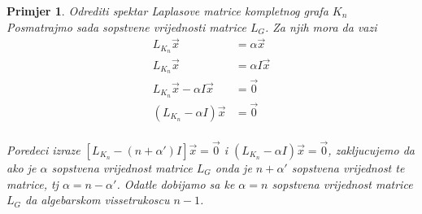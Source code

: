 \documentclass[11pt]{article}
\newtheorem{example}{Primjer}
\begin{document}
\begin{example}{Odrediti spektar Laplasove matrice kompletnog grafa $K_n$}
	Posmatrajmo sada sopstvene vrijednosti matrice $L_G$. Za njih mora da vazi \[
	\begin{split}
	L_{K_n} \vec{x} &= \alpha \vec{x} \\
	L_{K_n} \vec{x} &= \alpha I \vec{x} \\
	L_{K_n} \vec{x} - \alpha I \vec{x} &= \vec{0}  \\
	(L_{K_n} - \alpha I) \vec{x} &= \vec{0}  \\
	\end{split}
	\]
	
	Poredeci izraze $[L_{K_n} - (n + \alpha') I] \vec{x} = \vec{0}$ i $(L_{K_n} - \alpha I) \vec{x} = \vec{0}$, zakljucujemo da ako je $\alpha$ sopstvena vrijednost matrice $L_G$ onda je $n + \alpha'$ sopstvena vrijednost te matrice, tj $\alpha = n - \alpha'$. Odatle dobijamo sa ke $\alpha = n $ sopstvena vrijednost matrice $L_G$ da algebarskom vissetrukoscu $n-1$.
	  

\end{example}
\end{document}
